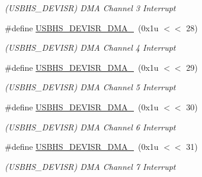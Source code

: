 \begin{DoxyCompactItemize}
\begin{DoxyCompactList}\small\item\em (U\+S\+B\+H\+S\+\_\+\+D\+E\+V\+I\+SR) D\+MA Channel 3 Interrupt \end{DoxyCompactList}\item 
\mbox{\label{group__SAMV71__USBHS_gac6ca63d05ec206ab5c6bdb900a56143d}} 
\#define \mbox{\hyperlink{group__SAMV71__USBHS_gac6ca63d05ec206ab5c6bdb900a56143d}{U\+S\+B\+H\+S\+\_\+\+D\+E\+V\+I\+S\+R\+\_\+\+D\+M\+A\+\_}}~(0x1u $<$$<$ 28)
\begin{DoxyCompactList}\small\item\em (U\+S\+B\+H\+S\+\_\+\+D\+E\+V\+I\+SR) D\+MA Channel 4 Interrupt \end{DoxyCompactList}\item 
\mbox{\label{group__SAMV71__USBHS_gafaa3187461761534a58264179fc9e76c}} 
\#define \mbox{\hyperlink{group__SAMV71__USBHS_gafaa3187461761534a58264179fc9e76c}{U\+S\+B\+H\+S\+\_\+\+D\+E\+V\+I\+S\+R\+\_\+\+D\+M\+A\+\_}}~(0x1u $<$$<$ 29)
\begin{DoxyCompactList}\small\item\em (U\+S\+B\+H\+S\+\_\+\+D\+E\+V\+I\+SR) D\+MA Channel 5 Interrupt \end{DoxyCompactList}\item 
\mbox{\label{group__SAMV71__USBHS_ga27613764636a9e15d4140ad5bf440774}} 
\#define \mbox{\hyperlink{group__SAMV71__USBHS_ga27613764636a9e15d4140ad5bf440774}{U\+S\+B\+H\+S\+\_\+\+D\+E\+V\+I\+S\+R\+\_\+\+D\+M\+A\+\_}}~(0x1u $<$$<$ 30)
\begin{DoxyCompactList}\small\item\em (U\+S\+B\+H\+S\+\_\+\+D\+E\+V\+I\+SR) D\+MA Channel 6 Interrupt \end{DoxyCompactList}\item 
\mbox{\label{group__SAMV71__USBHS_ga6e90562dc53a50c599f9d12f10fb3563}} 
\#define \mbox{\hyperlink{group__SAMV71__USBHS_ga6e90562dc53a50c599f9d12f10fb3563}{U\+S\+B\+H\+S\+\_\+\+D\+E\+V\+I\+S\+R\+\_\+\+D\+M\+A\+\_}}~(0x1u $<$$<$ 31)
\begin{DoxyCompactList}\small\item\em (U\+S\+B\+H\+S\+\_\+\+D\+E\+V\+I\+SR) D\+MA Channel 7 Interrupt \end{DoxyCompactList}\item 

\end{DoxyCompactItemize}
